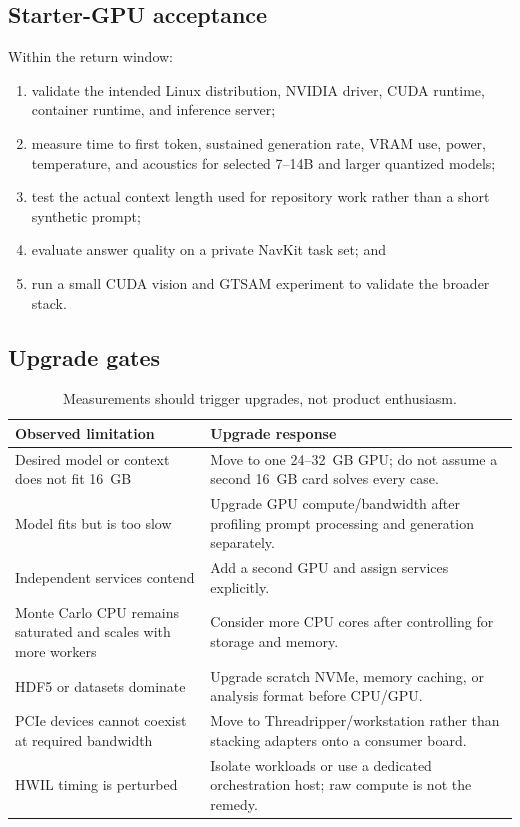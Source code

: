 \documentclass[11pt]{article}
\begin{document}
\subsection{Starter-GPU acceptance}

Within the return window:

\begin{enumerate}
  \item validate the intended Linux distribution, NVIDIA driver, CUDA runtime,
        container runtime, and inference server;
  \item measure time to first token, sustained generation rate, VRAM use, power,
        temperature, and acoustics for selected 7--14B and larger quantized models;
  \item test the actual context length used for repository work rather than a
        short synthetic prompt;
  \item evaluate answer quality on a private NavKit task set; and
  \item run a small CUDA vision and GTSAM experiment to validate the broader stack.
\end{enumerate}

\subsection{Upgrade gates}

\begin{table}[htbp]
\centering
\small
\begin{tabularx}{\textwidth}{L{0.28\textwidth} Y}
\toprule
Observed limitation & Upgrade response \\
\midrule
Desired model or context does not fit 16~GB & Move to one 24--32~GB GPU; do not assume a second 16~GB card solves every case. \\
Model fits but is too slow & Upgrade GPU compute/bandwidth after profiling prompt processing and generation separately. \\
Independent services contend & Add a second GPU and assign services explicitly. \\
Monte Carlo CPU remains saturated and scales with more workers & Consider more CPU cores after controlling for storage and memory. \\
HDF5 or datasets dominate & Upgrade scratch NVMe, memory caching, or analysis format before CPU/GPU. \\
PCIe devices cannot coexist at required bandwidth & Move to Threadripper/workstation rather than stacking adapters onto a consumer board. \\
HWIL timing is perturbed & Isolate workloads or use a dedicated orchestration host; raw compute is not the remedy. \\
\bottomrule
\end{tabularx}
\caption{Measurements should trigger upgrades, not product enthusiasm.}
\end{table}
\end{document}
